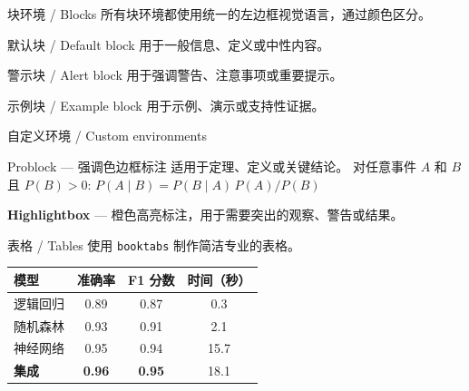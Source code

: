 \documentclass[aspectratio=169]{beamer}
\begin{document}
\begin{frame}{块环境 / Blocks}
    所有块环境都使用统一的左边框视觉语言，通过颜色区分。

    \begin{block}{默认块 / Default block}
        用于一般信息、定义或中性内容。
    \end{block}

    \begin{alertblock}{警示块 / Alert block}
        用于强调警告、注意事项或重要提示。
    \end{alertblock}

    \begin{exampleblock}{示例块 / Example block}
        用于示例、演示或支持性证据。
    \end{exampleblock}
\end{frame}

\begin{frame}{自定义环境 / Custom environments}
    \begin{problock}{Problock --- 强调色边框标注}
        适用于定理、定义或关键结论。
        对任意事件 $A$ 和 $B$ 且 $P(B) > 0$:\;
        $P(A \mid B) = {P(B \mid A)\, P(A)}/{P(B)}$
    \end{problock}

    \begin{highlightbox}
        \textbf{Highlightbox} --- 橙色高亮标注，用于需要突出的观察、警告或结果。
    \end{highlightbox}
\end{frame}

\begin{frame}{表格 / Tables}
    使用 \texttt{booktabs} 制作简洁专业的表格。

    \vspace{0.4cm}
    \centering
    \begin{tabular}{lccc}
        \toprule
        \textbf{模型} & \textbf{准确率} & \textbf{F1 分数} & \textbf{时间（秒）} \\
        \midrule
        逻辑回归 & 0.89 & 0.87 & 0.3 \\
        随机森林 & 0.93 & 0.91 & 2.1 \\
        神经网络 & 0.95 & 0.94 & 15.7 \\
        \textbf{集成} & \textbf{0.96} & \textbf{0.95} & 18.1 \\
        \bottomrule
    \end{tabular}
\end{frame}
\end{document}
